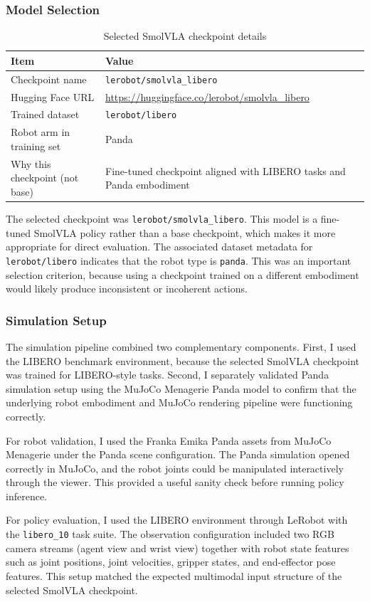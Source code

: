 \documentclass[11pt,a4paper]{article}
\begin{document}
\subsubsection{Model Selection}
\begin{table}[h]
\centering
\begin{tabular}{ll}
\toprule
Item & Value \\
\midrule
Checkpoint name & \texttt{lerobot/smolvla\_libero} \\
Hugging Face URL & \url{https://huggingface.co/lerobot/smolvla_libero} \\
Trained dataset & \texttt{lerobot/libero} \\
Robot arm in training set & Panda \\
Why this checkpoint (not base) & Fine-tuned checkpoint aligned with LIBERO tasks and Panda embodiment \\
\bottomrule
\end{tabular}
\caption{Selected SmolVLA checkpoint details}
\end{table}

The selected checkpoint was \texttt{lerobot/smolvla\_libero}. This model is a fine-tuned SmolVLA policy rather than a base checkpoint, which makes it more appropriate for direct evaluation. The associated dataset metadata for \texttt{lerobot/libero} indicates that the robot type is \texttt{panda}. This was an important selection criterion, because using a checkpoint trained on a different embodiment would likely produce inconsistent or incoherent actions.

\subsubsection{Simulation Setup}
The simulation pipeline combined two complementary components. First, I used the LIBERO benchmark environment, because the selected SmolVLA checkpoint was trained for LIBERO-style tasks. Second, I separately validated Panda simulation setup using the MuJoCo Menagerie Panda model to confirm that the underlying robot embodiment and MuJoCo rendering pipeline were functioning correctly.

For robot validation, I used the Franka Emika Panda assets from MuJoCo Menagerie under the Panda scene configuration. The Panda simulation opened correctly in MuJoCo, and the robot joints could be manipulated interactively through the viewer. This provided a useful sanity check before running policy inference.

For policy evaluation, I used the LIBERO environment through LeRobot with the \texttt{libero\_10} task suite. The observation configuration included two RGB camera streams (agent view and wrist view) together with robot state features such as joint positions, joint velocities, gripper states, and end-effector pose features. This setup matched the expected multimodal input structure of the selected SmolVLA checkpoint.
\end{document}
